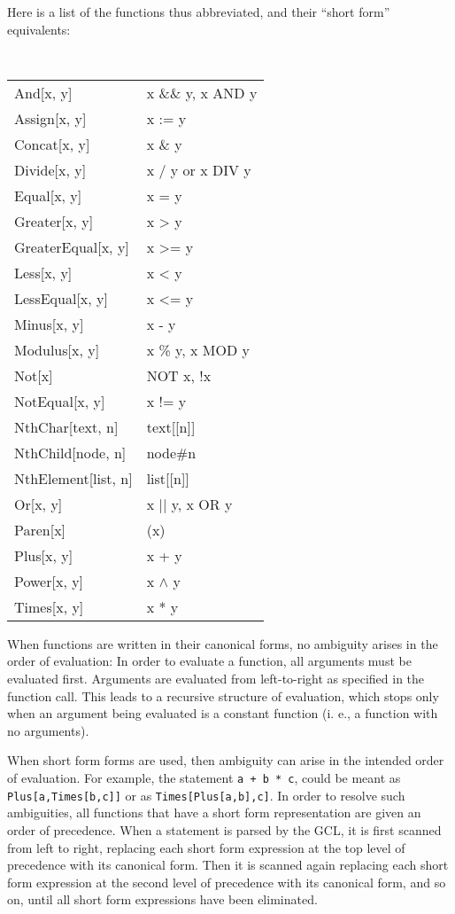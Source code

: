 Here is a list of the functions thus abbreviated, and their ``short form''
equivalents:

\medskip

{\tt
\begin{tabular}{lp{4in}}
And[x, y]		& x \&\& y, x AND y \\
Assign[x, y]		& x := y \\
Concat[x, y]            & x \& y \\
Divide[x, y]		& x / y or x DIV y \\
Equal[x, y]		& x = y \\
Greater[x, y]		& x > y \\
GreaterEqual[x, y]	& x >= y \\
Less[x, y]		& x < y \\
LessEqual[x, y]		& x <= y \\
Minus[x, y]		& x - y \\
Modulus[x, y]		& x \% y, x MOD y \\
Not[x]			& NOT x, !x \\
NotEqual[x, y]		& x != y \\
NthChar[text, n]	& text[[n]] \\
NthChild[node, n]	& node\#n \\ 
NthElement[list, n]	& list[[n]] \\
Or[x, y]		& x || y, x OR y \\
Paren[x]		& (x) \\ 
Plus[x, y]		& x + y \\
Power[x, y]	 	& x $\wedge$ y \\
Times[x, y]		& x * y \\
\end{tabular}
}

When functions are written in their canonical forms, no ambiguity
arises in the order of evaluation: In order to evaluate a function,
all arguments must be evaluated first.  Arguments are evaluated from
left-to-right as specified in the function call.
This leads to a recursive structure of evaluation,
which stops only when an argument being evaluated is a constant
function (i. e., a function with no arguments).

When short form forms are used, then ambiguity can arise in the
intended order of evaluation.  For example, the statement \verb&a + b * c&,
could be meant as \verb+Plus[a,Times[b,c]]+ or as
\verb+Times[Plus[a,b],c]+.  In order to resolve such ambiguities, all
functions that have a short form representation are given an order of
precedence.  When a statement is parsed by the GCL, it is first
scanned from left to right, replacing each short form expression at the
top level of precedence with its canonical form.  Then it is scanned
again replacing each short form expression at the second level of
precedence with its canonical form, and so on, until all short form
expressions have been eliminated.  

